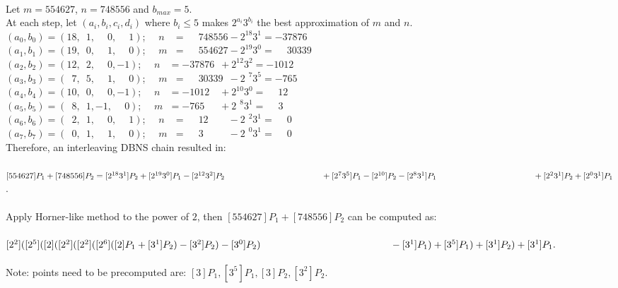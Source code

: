  \\
Let $m = 554627$, $n = 748556$ and $b_{max} = 5$. \\
At each step, let $(a_i,b_i,c_i,d_i)$ where $b_i \le 5$ makes $2^{a_i}3^{b_i}$ the best approximation of $m$ and $n$. \\
$(a_0,b_0) = (18,\phantom{0}1,\phantom{-}0,\phantom{-}1)$;		$\quad n\phantom{m} = \phantom{-}748556			- 2^{18}3^{1}		= -37876$ \\
$(a_1,b_1) = (19,\phantom{0}0,\phantom{-}1,\phantom{-}0)$;		$\quad m\phantom{n} = \phantom{-}554627			- 2^{19}3^{0}		= \phantom{-}30339$ \\
$(a_2,b_2) = (12,\phantom{0}2,\phantom{-}0,-1)$;			$\quad n\phantom{m} = -37876\phantom{0}			+ 2^{12}3^{2}		= -1012$ \\
$(a_3,b_3) = (\phantom{0}7,\phantom{0}5,\phantom{-}1,\phantom{-}0)$; 	$\quad m\phantom{n} = \phantom{-}30339\phantom{0}	- 2^{\phantom{0}7}3^{5} = -765$ \\
$(a_4,b_4) = (10,\phantom{0}0,\phantom{-}0,-1)$;			$\quad n\phantom{m}=  -1012\phantom{00}			+ 2^{10}3^{0}		= \phantom{-}12$ \\
$(a_5,b_5) = (\phantom{0}8,\phantom{0}1,-1,\phantom{-}0)$; 		$\quad m\phantom{n}=  -765\phantom{000}			+ 2^{\phantom{0}8}3^{1} = \phantom{-}3$ \\
$(a_6,b_6) = (\phantom{0}2,\phantom{0}1,\phantom{-}0,\phantom{-}1)$; 	$\quad n\phantom{m}= \phantom{-}12\phantom{0000}	- 2^{\phantom{0}2}3^{1} = \phantom{-}0$ \\
$(a_7,b_7) = (\phantom{0}0,\phantom{0}1,\phantom{-}1,\phantom{-}0)$; 	$\quad m\phantom{n}= \phantom{-}3\phantom{00000}	- 2^{\phantom{0}0}3^{1} = \phantom{-}0$ \\
Therefore, an interleaving DBNS chain resulted in: \\
\\
$[554627]P_1 + [748556]P_2 = [2^{18}3^{1}]P_2 + [2^{19}3^{0}]P_1 - [2^{12}3^{2}]P_2 \\
\phantom{[554627]P_1 + [748556]P_2 =}
			+ [2^{7}3^{5}]P_1 - [2^{10}]P_2 - [2^{8}3^{1}]P_1 \\
\phantom{[554627]P_1 + [748556]P_2 =}
			+ [2^{2}3^{1}]P_2 + [2^{0}3^{1}]P_1$. \\
\\
Apply Horner-like method to the power of $2$, then $[554627]P_1 + [748556]P_2$ can be computed as: \\
\\
$[2^2]([2^5]([2]([2^2]([2^2]([2^6]([2]P_1 + [3^1]P_2) - [3^2]P_2) - [3^0]P_2) \\
\phantom{[2^2]([2^5]([2]([2^2]([2^2]([2^6]([2]P_1}
- [3^1]P_1) + [3^5]P_1) + [3^1]P_2) + [3^1]P_1.$ \\
\\
Note: points need to be precomputed are: $[3]P_1, [3^5]P_1, [3]P_2, [3^2]P_2$. \\


